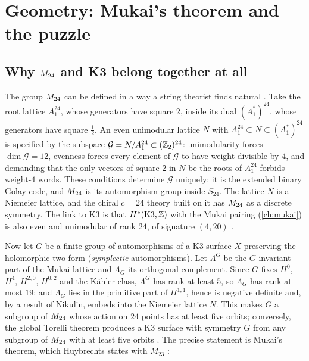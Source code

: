 \section{Geometry: Mukai's theorem and the puzzle}\label{sec:moonshine:geometry}

\subsection{Why \texorpdfstring{$M_{24}$}{M24} and K3 belong together at all}

The group $M_{24}$ can be defined in a way a string theorist finds natural
. Take the root lattice $A_1^{24}$, whose generators have
square $2$, inside its dual $(A_1^*)^{24}$, whose generators have square $\tfrac12$. An even
unimodular lattice $N$ with $A_1^{24}\subset N\subset(A_1^*)^{24}$ is specified by the
subspace $\mathcal G=N/A_1^{24}\subset(\mathbb{Z}_2)^{24}$: unimodularity forces
$\dim\mathcal G=12$, evenness forces every element of $\mathcal G$ to have weight divisible
by $4$, and demanding that the only vectors of square $2$ in $N$ be the roots of $A_1^{24}$
forbids weight-$4$ words. These conditions determine $\mathcal G$ uniquely: it is the
extended binary Golay code, and $M_{24}$ is its automorphism group inside
$S_{24}$. The lattice $N$ is a Niemeier lattice, and the chiral $c=24$ theory built on it has
$M_{24}$ as a discrete symmetry. The link to K3 is that $H^*(\mathrm{K3},\mathbb{Z})$ with the Mukai
pairing (\cref{ch:mukai}) is also even and unimodular of rank $24$, of signature $(4,20)$
.

Now let $G$ be a finite group of automorphisms of a K3 surface $X$ preserving the holomorphic
two-form (\emph{symplectic} automorphisms). Let $\Lambda^G$ be the $G$-invariant part of
the Mukai lattice and $\Lambda_G$ its orthogonal complement. Since $G$ fixes $H^0$, $H^4$,
$H^{2,0}$, $H^{0,2}$ and the K\"ahler class, $\Lambda^G$ has rank at least $5$, so
$\Lambda_G$ has rank at most $19$; and $\Lambda_G$ lies in the primitive part of $H^{1,1}$,
hence is negative definite and, by a result of Nikulin, embeds into the Niemeier lattice
$N$. This makes $G$ a subgroup of $M_{24}$ whose action on $24$ points has at least five
orbits; conversely, the global Torelli theorem produces a K3 surface with symmetry $G$ from
any subgroup of $M_{24}$ with at least five orbits . The
precise statement is Mukai's theorem, which Huybrechts states with $M_{23}$
:

